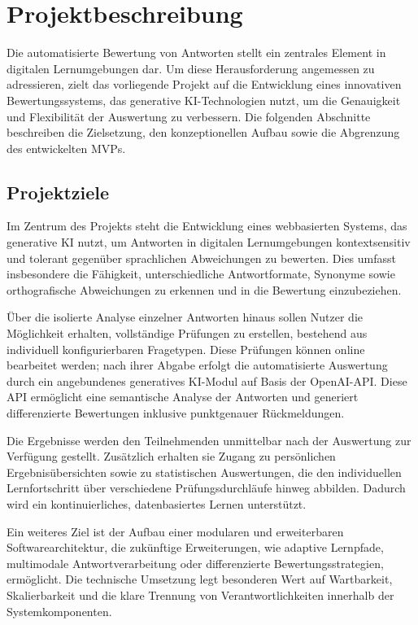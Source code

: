 \documentclass[a4paper,12pt]{article}
\begin{document}
\newpage

\section{Projektbeschreibung}
Die automatisierte Bewertung von Antworten stellt ein zentrales Element in digitalen Lernumgebungen dar. Um diese Herausforderung angemessen zu adressieren, zielt das vorliegende Projekt auf die Entwicklung eines innovativen Bewertungssystems, das generative KI-Technologien nutzt, um die Genauigkeit und Flexibilität der Auswertung zu verbessern. Die folgenden Abschnitte beschreiben die Zielsetzung, den konzeptionellen Aufbau sowie die Abgrenzung des entwickelten MVPs.


\subsection{Projektziele}
Im Zentrum des Projekts steht die Entwicklung eines webbasierten Systems, das generative KI nutzt, um Antworten in digitalen Lernumgebungen kontextsensitiv und tolerant gegenüber sprachlichen Abweichungen zu bewerten. Dies umfasst insbesondere die Fähigkeit, unterschiedliche Antwortformate, Synonyme sowie orthografische Abweichungen zu erkennen und in die Bewertung einzubeziehen.

Über die isolierte Analyse einzelner Antworten hinaus sollen Nutzer die Möglichkeit erhalten, vollständige Prüfungen zu erstellen, bestehend aus individuell konfigurierbaren Fragetypen. Diese Prüfungen können online bearbeitet werden; nach ihrer Abgabe erfolgt die automatisierte Auswertung durch ein angebundenes generatives KI-Modul auf Basis der OpenAI-API. Diese API ermöglicht eine semantische Analyse der Antworten und generiert differenzierte Bewertungen inklusive punktgenauer Rückmeldungen.

Die Ergebnisse werden den Teilnehmenden unmittelbar nach der Auswertung zur Verfügung gestellt. Zusätzlich erhalten sie Zugang zu persönlichen Ergebnisübersichten sowie zu statistischen Auswertungen, die den individuellen Lernfortschritt über verschiedene Prüfungsdurchläufe hinweg abbilden. Dadurch wird ein kontinuierliches, datenbasiertes Lernen unterstützt.

Ein weiteres Ziel ist der Aufbau einer modularen und erweiterbaren Softwarearchitektur, die zukünftige Erweiterungen, wie adaptive Lernpfade, multimodale Antwortverarbeitung oder differenzierte Bewertungsstrategien, ermöglicht. Die technische Umsetzung legt besonderen Wert auf Wartbarkeit, Skalierbarkeit und die klare Trennung von Verantwortlichkeiten innerhalb der Systemkomponenten.
\end{document}
